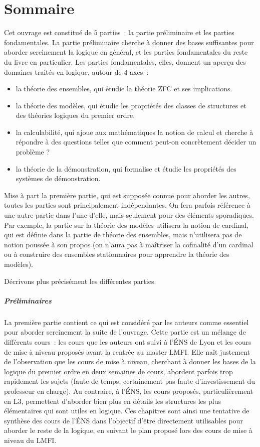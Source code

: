 \chapter[Sommaire]{Sommaire}

Cet ouvrage est constitué de $5$ parties~: la partie préliminaire et les parties
fondamentales. La partie préliminaire cherche à donner des bases suffisantes
pour aborder sereinement la logique en général, et les parties fondamentales du
reste du livre en particulier. Les parties fondamentales, elles, donnent un
aperçu des domaines traités en logique, autour de $4$ axes~:
\begin{itemize}
\item la théorie des ensembles, qui étudie la théorie ZFC et ses implications.
\item la théorie des modèles, qui étudie les propriétés des classes de
  structures et des théories logiques du premier ordre.
\item la calculabilité, qui ajoue aux mathématiques la notion de calcul et
  cherche à répondre à des questions telles que \og comment peut-on concrètement
  décider un problème ?\fg
\item la théorie de la démonstration, qui formalise et étudie les propriétés des
  systèmes de démonstration.
\end{itemize}

Mise à part la première partie, qui est supposée connue pour aborder les autres,
toutes les parties sont principalement indépendantes. On fera parfois référence
à une autre partie dans l'une d'elle, mais seulement pour des éléments
sporadiques. Par exemple, la partie sur la théorie des modèles utilisera la
notion de cardinal, qui est définie dans la partie de théorie des ensembles,
mais n'utilisera pas de notion poussée à son propos (on n'aura pas à maîtriser
la cofinalité d'un cardinal ou à construire des ensembles stationnaires pour
apprendre la théorie des modèles).

Décrivons plus précisément les différentes parties.

\paragraph{Préliminaires}
La première partie contient ce qui est considéré par les auteurs comme essentiel
pour aborder sereinement la suite de l'ouvrage. Cette partie est un mélange de
différents cours~: les cours que les auteurs ont suivi à l'\'ENS de Lyon et les
cours de mise à niveau proposés avant la rentrée au master LMFI. Elle naît
justement de l'observation que les cours de mise à niveau, cherchant à donner
les bases de la logique du premier ordre en deux semaines de cours, abordent
parfois trop rapidement les sujets (faute de temps, certainement pas faute
d'investissement du professeur en charge). Au contraire, à l'\'ENS, les cours
proposés, particulièrement en L3, permettent d'aborder bien plus en détails les
structures les plus élémentaires qui sont utiles en logique. Ces chapitres sont
ainsi une tentative de synthèse des cours de l'\'ENS dans l'objectif d'être
directement utilisables pour aborder le reste de la logique, en suivant le
plan proposé lors des cours de mise à niveau du LMFI.

